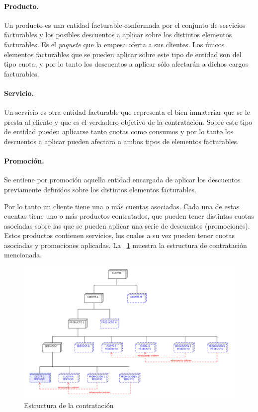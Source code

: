 \paragraph{Producto.} Un producto es una entidad facturable conformada por el conjunto de servicios facturables y los posibles descuentos a aplicar sobre los distintos elementos facturables. Es el \textit{paquete} que la empesa oferta a sus clientes. Los únicos elementos facturables que se pueden aplicar sobre este tipo de entidad son del tipo cuota, y por lo tanto los descuentos a aplicar sólo afectarán a dichos cargos facturables.

\paragraph{Servicio.} Un servicio es otra entidad facturable que representa el bien inmateriar que se le presta al cliente y que es el verdadero objetivo de la contratación. Sobre este tipo de entidad pueden aplicarse tanto cuotas como consumos  y por lo tanto los descuentos a aplicar pueden afectara a ambos tipos de elementos facturables.

\paragraph{Promoción.} Se entiene por promoción aquella entidad encargada de aplicar los descuentos previamente definidos sobre los distintos elementos facturables.


Por lo tanto un cliente tiene una o más cuentas asociadas. Cada una de estas cuentas tiene uno o más productos contratados, que pueden tener distintas cuotas asociadas sobre las que se pueden aplicar una serie de descuentos (promociones). Estos productos contienen servicios, los cuales a su vez pueden tener cuotas asociadas y promociones aplicadas. La \figurename~\ref{fig:estructura-contratacion-chap-teoria} muestra la estructura de contratación mencionada. 

\begin{figure}
  \centering
  \includegraphics[width=\textwidth]{imaxes/estructura-contratacion.png}
  \caption{Estructura de la contratación}
  \label{fig:estructura-contratacion-chap-teoria}
\end{figure}




